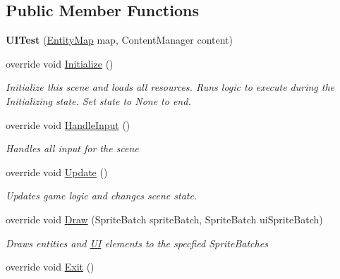 \subsection*{Public Member Functions}
\begin{DoxyCompactItemize}
\item 
\hypertarget{class_midnight_blue_1_1_engine_1_1_testing_1_1_u_i_test_a953e652383b5699ea1309f6b63c01ec8}{}\label{class_midnight_blue_1_1_engine_1_1_testing_1_1_u_i_test_a953e652383b5699ea1309f6b63c01ec8} 
{\bfseries U\+I\+Test} (\hyperlink{class_midnight_blue_1_1_engine_1_1_entity_component_1_1_entity_map}{Entity\+Map} map, Content\+Manager content)
\item 
override void \hyperlink{class_midnight_blue_1_1_engine_1_1_testing_1_1_u_i_test_ad2b7f129febf8658c10c7881af15c847}{Initialize} ()
\begin{DoxyCompactList}\small\item\em Initialize this scene and loads all resources. Runs logic to execute during the Initializing state. Set state to None to end. \end{DoxyCompactList}\item 
override void \hyperlink{class_midnight_blue_1_1_engine_1_1_testing_1_1_u_i_test_a6c891f10050ee05fddb5c6d177e80782}{Handle\+Input} ()
\begin{DoxyCompactList}\small\item\em Handles all input for the scene \end{DoxyCompactList}\item 
override void \hyperlink{class_midnight_blue_1_1_engine_1_1_testing_1_1_u_i_test_a9866becb1e9b6bf9b9edb0f732b46250}{Update} ()
\begin{DoxyCompactList}\small\item\em Updates game logic and changes scene state. \end{DoxyCompactList}\item 
override void \hyperlink{class_midnight_blue_1_1_engine_1_1_testing_1_1_u_i_test_a8c8604e47a7ac4ef8b8c74e82ff5cb83}{Draw} (Sprite\+Batch sprite\+Batch, Sprite\+Batch ui\+Sprite\+Batch)
\begin{DoxyCompactList}\small\item\em Draws entities and \hyperlink{namespace_midnight_blue_1_1_engine_1_1_u_i}{UI} elements to the specfied Sprite\+Batches \end{DoxyCompactList}\item 
override void \hyperlink{class_midnight_blue_1_1_engine_1_1_testing_1_1_u_i_test_a48b16a69a8d34b0d8d2fc30ead3c79ca}{Exit} ()

\end{DoxyCompactItemize}
